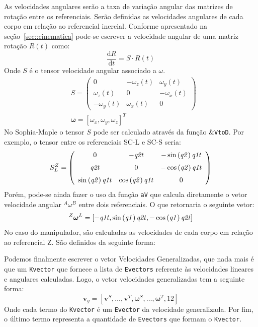 As velocidades angulares serão a taxa de variação angular das matrizes de
rotação entre os referenciais. Serão definidas as velocidades angulares de cada
corpo em relação ao referencial inercial. Conforme apresentado na
seção~\ref{sec::cinematica} pode-se escrever a velocidade angular de uma matriz
rotação $R(t)$ como:
%
\begin{equation} \label{eq::velang}
	\frac{\mathrm{d} R}{\mathrm{d} t} = S \cdot R(t)
\end{equation}
%
Onde $S$ é o tensor velocidade angular associado a $\omega$.
%
\begin{align}
& S = \begin{pmatrix}
0				& -\omega_{z}(t)	& \omega_{y}(t) \\ 
\omega_{z}(t)	& 0					& -\omega_{x}(t) \\ 
-\omega_{y}(t)	& \omega_{x}(t)		& 0
\end{pmatrix} \\
& \boldsymbol{\omega} = [\omega_{x}, \omega_{y}, \omega_{z}]^{T}
\end{align}
%
No Sophia-Maple o tensor $S$ pode ser calculado através da função
\&\texttt{VtoD}. Por exemplo, o tensor entre os referenciais SC-L e SC-S seria:
%
$$
S_{L}^{Z} = \left( \begin {array}{ccc} 0&-{\it q2t}&-\sin \left( {\it q2}
 \right) {\it q1t}\\ \noalign{\medskip}{\it q2t}&0&-\cos \left( {\it 
q2} \right) {\it q1t}\\ \noalign{\medskip}\sin \left( {\it q2}
 \right) {\it q1t}&\cos \left( {\it q2} \right) {\it q1t}&0
\end {array} \right)
$$
%
Porém, pode-se ainda fazer o uso da função \texttt{aV} que
calcula diretamente o vetor velocidade angular $^{A}\omega^{B}$ entre dois
referenciais. O que retornaria o seguinte vetor:
%
$$
^{Z}\boldsymbol{\omega}^{L} = [-{\it q1t},\sin \left( {\it q1} \right) {\it q2t},-\cos
\left( {\it q1} \right) {\it q2t}]
$$
%
No caso do manipulador, são calculadas as velocidades de cada corpo em relação
ao referencial Z. São definidos da seguinte forma:

\bigskip {} \bigskip 

Podemos finalmente escrever o vetor Velocidades Generalizadas, que nada mais é
que um \texttt{Kvector} que fornece a lista de \texttt{Evectors} referente às
velocidades lineares e angulares calculadas. Logo, o vetor velocidades
generalizadas tem a seguinte forma:
%
\begin{equation}
	\mathbf{v}_{g} = [ \mathbf{v}^{S},\ldots, \mathbf{v}^{T}, \boldsymbol{\omega}^{S},\ldots,
	\boldsymbol{\omega}^{T}, 12]
\end{equation}
%
Onde cada termo do \texttt{Kvector} é um \texttt{Evector} da velocidade
generalizada.
Por fim, o último termo representa a quantidade de \texttt{Evectors} que formam o
\texttt{Kvector}.

